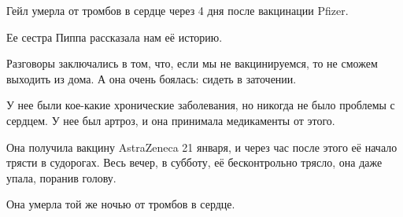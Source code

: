 Гейл умерла от тромбов в сердце через 4 дня после вакцинации Pfizer.

Ее сестра Пиппа рассказала нам её историю.

Разговоры заключались в том, что, если мы не вакцинируемся, то не сможем
выходить из дома. А она очень боялась: сидеть в заточении.

У нее были кое-какие хронические заболевания, но никогда не было проблемы с
сердцем. У нее был артроз, и она принимала медикаменты от этого.

Она получила вакцину AstraZeneca 21 января, и через час после этого её начало
трясти в судорогах. Весь вечер, в субботу, её бесконтрольно трясло, она даже
упала, поранив голову.

Она умерла той же ночью от тромбов в сердце.

